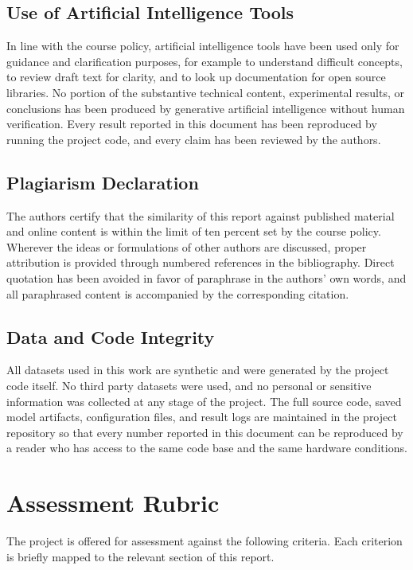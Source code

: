 \documentclass[12pt,a4paper]{article}
\begin{document}
\subsection{Use of Artificial Intelligence Tools}
In line with the course policy, artificial intelligence tools have been used only for guidance and clarification purposes, for example to understand difficult concepts, to review draft text for clarity, and to look up documentation for open source libraries. No portion of the substantive technical content, experimental results, or conclusions has been produced by generative artificial intelligence without human verification. Every result reported in this document has been reproduced by running the project code, and every claim has been reviewed by the authors.

\subsection{Plagiarism Declaration}
The authors certify that the similarity of this report against published material and online content is within the limit of ten percent set by the course policy. Wherever the ideas or formulations of other authors are discussed, proper attribution is provided through numbered references in the bibliography. Direct quotation has been avoided in favor of paraphrase in the authors' own words, and all paraphrased content is accompanied by the corresponding citation.

\subsection{Data and Code Integrity}
All datasets used in this work are synthetic and were generated by the project code itself. No third party datasets were used, and no personal or sensitive information was collected at any stage of the project. The full source code, saved model artifacts, configuration files, and result logs are maintained in the project repository so that every number reported in this document can be reproduced by a reader who has access to the same code base and the same hardware conditions.

\section{Assessment Rubric}
The project is offered for assessment against the following criteria. Each criterion is briefly mapped to the relevant section of this report.
\end{document}
